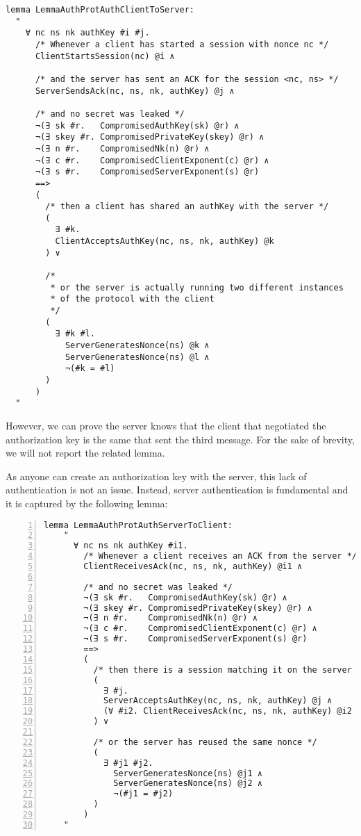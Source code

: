 \begin{lstlisting}
lemma LemmaAuthProtAuthClientToServer:
  "
    ∀ nc ns nk authKey #i #j.
      /* Whenever a client has started a session with nonce nc */
      ClientStartsSession(nc) @i ∧

      /* and the server has sent an ACK for the session <nc, ns> */
      ServerSendsAck(nc, ns, nk, authKey) @j ∧

      /* and no secret was leaked */          
      ¬(∃ sk #r.   CompromisedAuthKey(sk) @r) ∧
      ¬(∃ skey #r. CompromisedPrivateKey(skey) @r) ∧
      ¬(∃ n #r.    CompromisedNk(n) @r) ∧
      ¬(∃ c #r.    CompromisedClientExponent(c) @r) ∧
      ¬(∃ s #r.    CompromisedServerExponent(s) @r)
      ==>
      (
        /* then a client has shared an authKey with the server */
        (
          ∃ #k.
          ClientAcceptsAuthKey(nc, ns, nk, authKey) @k
        ) ∨

        /* 
         * or the server is actually running two different instances
         * of the protocol with the client
         */
        (
          ∃ #k #l.
            ServerGeneratesNonce(ns) @k ∧
            ServerGeneratesNonce(ns) @l ∧
            ¬(#k = #l)
        )
      )
  "
\end{lstlisting}

However, we can prove the server knows that the client that negotiated the authorization key is the same that sent the third message. For the sake of brevity, we will not report the related lemma.

As anyone can create an authorization key with the server, this lack of authentication is not an issue. Instead, server authentication is fundamental and it is captured by the following lemma:
\begin{lstlisting}[numbers=left]
  lemma LemmaAuthProtAuthServerToClient:
    "
      ∀ nc ns nk authKey #i1.
        /* Whenever a client receives an ACK from the server */
        ClientReceivesAck(nc, ns, nk, authKey) @i1 ∧
        
        /* and no secret was leaked */
        ¬(∃ sk #r.   CompromisedAuthKey(sk) @r) ∧
        ¬(∃ skey #r. CompromisedPrivateKey(skey) @r) ∧
        ¬(∃ n #r.    CompromisedNk(n) @r) ∧
        ¬(∃ c #r.    CompromisedClientExponent(c) @r) ∧
        ¬(∃ s #r.    CompromisedServerExponent(s) @r)
        ==>
        (
          /* then there is a session matching it on the server */
          ( 
            ∃ #j.
            ServerAcceptsAuthKey(nc, ns, nk, authKey) @j ∧
            (∀ #i2. ClientReceivesAck(nc, ns, nk, authKey) @i2 ==> #i1 = #i2)
          ) ∨

          /* or the server has reused the same nonce */
          (
            ∃ #j1 #j2.
              ServerGeneratesNonce(ns) @j1 ∧
              ServerGeneratesNonce(ns) @j2 ∧
              ¬(#j1 = #j2)
          )
        )
    "
\end{lstlisting}

